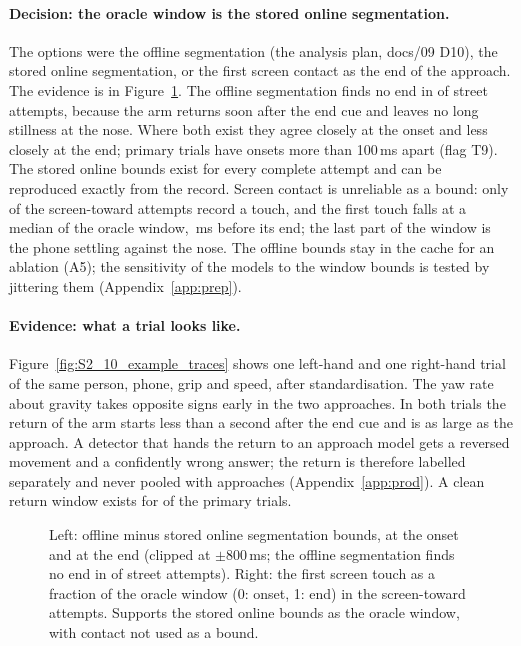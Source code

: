 \paragraph{Decision: the oracle window is the stored online segmentation.} The options were the offline
segmentation (the analysis plan, docs/09 D10), the stored online segmentation, or the first screen contact as
the end of the approach. The evidence is in Figure~\ref{fig:S2_09_segmentation_contact}. The offline
segmentation finds no end in  of street attempts, because the arm
returns soon after the end cue and leaves no long stillness at the nose. Where both exist they agree closely at
the onset and less closely at the end;  primary trials have onsets more than
100\,ms apart (flag T9). The stored online bounds exist for every complete attempt and can be reproduced
exactly from the record. Screen contact is unreliable as a bound: only  of the
screen-toward attempts record a touch, and the first touch falls at a median 
of the oracle window, \,ms before its end; the last part of the window is the
phone settling against the nose. The offline bounds stay in the cache for an ablation (A5); the sensitivity of the models to the window
bounds is tested by jittering them (Appendix~\ref{app:prep}).

\paragraph{Evidence: what a trial looks like.} Figure~\ref{fig:S2_10_example_traces} shows one left-hand and
one right-hand trial of the same person, phone, grip and speed, after standardisation. The yaw rate about
gravity takes opposite signs early in the two approaches. In both trials the return of the arm starts less than a second
after the end cue and is as large as the approach. A detector that hands the return to an approach model
gets a reversed movement and a confidently wrong answer; the return is therefore labelled separately and never
pooled with approaches (Appendix~\ref{app:prod}). A clean return window exists for 
of the primary trials.

\begin{figure}[htbp]
\centering
{}
\caption{Left: offline minus stored online segmentation bounds, at the onset and at the end (clipped at
$\pm$800\,ms; the offline segmentation finds no end in  of street
attempts). Right: the first screen touch as a fraction of the oracle window (0: onset, 1: end) in the
screen-toward attempts. Supports the stored online bounds as the oracle window, with contact not used as a
bound.}
\label{fig:S2_09_segmentation_contact}
\end{figure}

